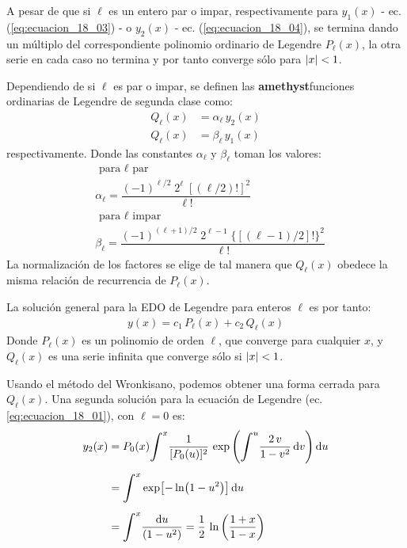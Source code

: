 \documentclass[12pt]{article}
\def\scaleint#1{\vcenter{\hbox{\scaleto[3ex]{\displaystyle\int}{#1}}}}
\numberwithin{equation}{section}
\begin{document}
A pesar de que si $\ell$ es un entero par o impar, respectivamente para $y_{1}(x)$ - ec. (\ref{eq:ecuacion_18_03}) - o $y_{2}(x)$ - ec. (\ref{eq:ecuacion_18_04}),  se termina dando un múltiplo del correspondiente polinomio ordinario de Legendre $P_{\ell}(x)$,  la otra serie en cada caso no termina y por tanto converge sólo para $\abs{x} < 1$.
\par
Dependiendo de si $\ell$ es par o impar, se definen las \textbf{amethyst}{funciones ordinarias de Legendre de segunda clase} como:
\begin{align*}
Q_{\ell} (x) &=  \alpha_{\ell} \, y_{2} (x) \\
Q_{\ell} (x) &=  \beta_{\ell} \, y_{1} (x)
\end{align*}
respectivamente. Donde las constantes $\alpha_{\ell}$ y $\beta_{\ell}$ toman los valores:
\begin{align}
&\mbox{ para $\ell$ par} \nonumber \\
&\alpha_{\ell} = \dfrac{(-1)^{\ell/2} \; 2^{\ell} \; [(\ell / 2)!]^{2}}{\ell!} \label{eq:ecuacion_18_05} \\[1em]
&\mbox{ para $\ell$ impar} \nonumber \\
&\beta_{\ell} = \dfrac{(-1)^{(\ell + 1)/2} \; 2^{\ell - 1} \; \lbrace \left[ (\ell - 1) /2 \right] ! \rbrace^{2}}{\ell!} \label{eq:ecuacion_18_06}
\end{align}
La normalización de los factores se elige de tal manera que $Q_{\ell} (x)$ obedece la misma relación de recurrencia de $P_{\ell} (x)$.
\par
La solución general para la EDO de Legendre para enteros $\ell$ es por tanto:
\begin{align}
y (x) = c_{1} \, P_{\ell} (x) + c_{2} \, Q_{\ell} (x) 
\label{eq:ecuacion_18_07}
\end{align}
Donde $P_{\ell} (x)$ es un polinomio de orden $\ell$, que converge para cualquier $x$, y $Q_{\ell} (x)$ es una serie infinita que converge sólo si $\abs{x} < 1$.
\par
Usando el método del Wronkisano, podemos obtener una forma cerrada para $Q_{\ell} (x)$. Una segunda solución para la ecuación de Legendre (ec. \ref{eq:ecuacion_18_01}), con $\ell = 0$ es:
\begin{eqnarray}
\begin{aligned}[b]
y_{2} (x) &= P_{0} (x) \scaleint{6ex}^{x} \dfrac{1}{[P_{0} (u)]^{2}} \, \exp \left( \scaleint{6ex}^{u} \dfrac{2 \, v}{1 - v^{2}} \dd{v} \right) \dd{u} \\[0.5em] 
&= \scaleint{6ex}^{x} \exp [ - \ln (1 - u^{2}) ] \dd{u} \\[0.5em] 
&= \scaleint{6ex}^{x} \dfrac{\dd{u}}{(1 - u^{2})} = \dfrac{1}{2} \, \ln \left( \dfrac{1 + x}{1 - x} \right)
\end{aligned}
\label{eq:ecuacion_18_08}
\end{eqnarray}
\end{document}
